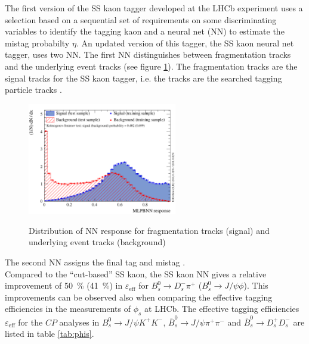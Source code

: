 \documentclass{PoS}
\begin{document}
The first version of the SS kaon tagger developed at the LHCb experiment uses a selection based on a sequential set of requirements on some discriminating variables to identify the tagging kaon and a neural net (NN) to estimate the mistag probabilty $\eta$. An updated version of this tagger, the SS kaon neural net tagger, uses two NN. The first NN distinguishes between fragmentation tracks and the underlying event tracks (see figure \ref{fig:nnet}). The fragmentation tracks are the signal tracks for the SS kaon tagger, i.e. the tracks are the searched tagging particle tracks \cite{2}. 
\begin{figure}[htbp]
	\begin{center}
		\includegraphics[width=0.58\textwidth, angle=0]{figs/sskaonNnetfirstNN3.pdf}
		\small{\caption{Distribution of NN response for fragmentation tracks (signal) and underlying event tracks (background) \cite{2}}}
		\label{fig:nnet}
	\end{center}
\end{figure}
The second NN assigns the final tag and mistag \cite{13}.\\ 
Compared to the \enquote{cut-based} SS kaon, the SS kaon NN gives a relative improvement of \SI{50}{\%} (\SI{41}{\%}) in $\varepsilon_\text{eff}$ for $B_s^0\to D_s^-\pi^+$ ($B_s^0\to J\!/\!\psi\phi$). This improvements can be observed also when comparing the effective tagging efficiencies in the measurements of $\phi_s$ at LHCb. The effective tagging efficiencies $\varepsilon_\text{eff}$ for the $C\!P$ analyses in \mbox{$B_s^0\to J\!/\!\psi K^+K^-$}, $\bar{B}_s^0\to J\!/\!\psi \pi^+\pi^-$ and $\bar{B}_s^0\to D_s^+D_s^-$ are listed in table \ref{tab:phis}.
\end{document}
